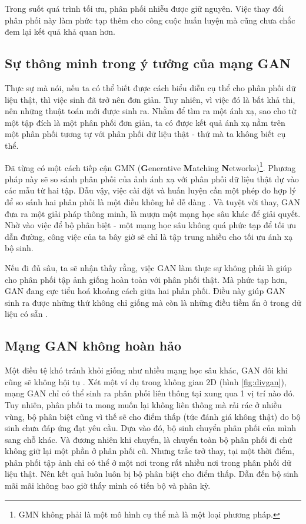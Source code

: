 \documentclass[a4paper, 12pt]{report}
\begin{document}
Trong suốt quá trình tối ưu, phân phối nhiễu được giữ nguyên.
Việc thay đổi phân phối này làm phức tạp thêm cho công cuộc huấn luyện mà cũng chưa chắc đem lại kết quả khả quan hơn.

\subsection{Sự thông minh trong ý tưởng của mạng GAN}

Thực sự mà nói, nếu ta có thể biết được cách biểu diễn cụ thể cho phân phối dữ liệu thật, thì việc sinh đã trở nên đơn giản.
Tuy nhiên, vì việc đó là bất khả thi, nên những thuật toán mới được sinh ra.
Nhằm để tìm ra một ánh xạ, sao cho từ một tập đích là một phân phối đơn giản, ta có được kết quả ánh xạ nằm trên một phân phối tương tự với phân phối dữ liệu thật - thứ mà ta không biết cụ thể.\vspace{5pt}

Đã từng có một cách tiếp cận GMN (\textbf{G}enerative \textbf{M}atching \textbf{N}etworks)\footnote{GMN không phải là một mô hình cụ thể mà là một loại phương pháp.}.
Phương pháp này sẽ so sánh phân phối của ảnh ánh xạ với phân phối dữ liệu thật dự vào các mẫu từ hai tập.
Dẫu vậy, việc cài đặt và huấn luyện cần một phép đo hợp lý để so sánh hai phân phối là một điều không hề dễ dàng \cite{replyganovergmn2019}.
Và tuyệt vời thay, GAN đưa ra một giải pháp thông minh, là mượn một mạng học sâu khác để giải quyết.
Nhờ vào việc để bộ phân biệt - một mạng học sâu không quá phức tạp để tối ưu dẫn đường, công việc của ta bây giờ sẽ chỉ là tập trung nhiều cho tối ưu ánh xạ bộ sinh.\vspace{5pt}

Nếu đi đủ sâu, ta sẽ nhận thấy rằng, việc GAN làm thực sự không phải là giúp cho phân phối tập ảnh giống hoàn toàn với phân phối thật.
Mà phức tạp hơn, GAN đang cực tiểu hoá khoảng cách giữa hai phân phối.
Điều này giúp GAN sinh ra được những thứ không chỉ giống mà còn là những điều tiềm ẩn ở trong dữ liệu có sẵn \cite{gregoiregan2019}.

\subsection{Mạng GAN không hoàn hảo}

Một điều tệ khó tránh khỏi giống như nhiều mạng học sâu khác, GAN đôi khi cũng sẽ không hội tụ \cite{barnett2018convergence}.
Xét một ví dụ trong không gian 2D (hình \ref{fig:divgan}), mạng GAN chỉ có thể sinh ra phân phối liên thông tại xung qua 1 vị trí nào đó.
Tuy nhiên, phân phối ta mong muốn lại không liên thông mà rải rác ở nhiều vùng, bộ phân biệt cũng vì thế sẽ cho điểm thấp (tức đánh giá không thật) do bộ sinh chưa đáp ứng đạt yêu cầu.
Dựa vào đó, bộ sinh chuyển phân phối của mình sang chỗ khác.
Và đương nhiên khi chuyển, là chuyển toàn bộ phân phối đi chứ không giữ lại một phần ở phân phối cũ.
Nhưng trắc trở thay, tại một thời điểm, phân phối tập ảnh chỉ có thể ở một nơi trong rất nhiều nơi trong phân phối dữ liệu thật.
Nên kết quả luôn luôn bị bộ phân biệt cho điểm thấp.
Dẫn đến bộ sinh mãi mãi không bao giờ thấy mình có tiến bộ và phân kỳ.
\end{document}
